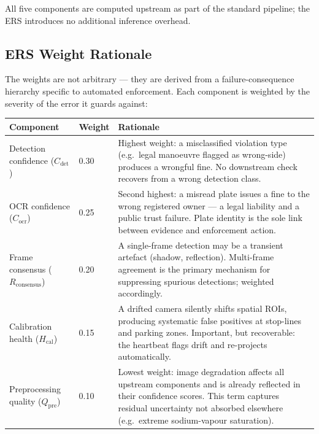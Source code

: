 \documentclass[11pt,a4paper]{article}
\begin{document}
\noindent All five components are computed upstream as part of the standard pipeline; the ERS introduces no additional inference overhead.

\subsection*{ERS Weight Rationale}

The weights are not arbitrary — they are derived from a failure-consequence hierarchy specific to automated enforcement. Each component is weighted by the severity of the error it guards against:

\begin{center}
\begin{longtable}{L{3.2cm} C{1.2cm} L{9.5cm}}
    \toprule
    \color{white}\textbf{Component} & \color{white}\textbf{Weight} & \color{white}\textbf{Rationale} \\
    \midrule
    Detection confidence ($C_{\text{det}}$) & 0.30 & Highest weight: a misclassified violation type (e.g.\ legal manoeuvre flagged as wrong-side) produces a wrongful fine. No downstream check recovers from a wrong detection class. \\
    OCR confidence ($C_{\text{ocr}}$) & 0.25 & Second highest: a misread plate issues a fine to the wrong registered owner — a legal liability and a public trust failure. Plate identity is the sole link between evidence and enforcement action. \\
    Frame consensus ($R_{\text{consensus}}$) & 0.20 & A single-frame detection may be a transient artefact (shadow, reflection). Multi-frame agreement is the primary mechanism for suppressing spurious detections; weighted accordingly. \\
    Calibration health ($H_{\text{cal}}$) & 0.15 & A drifted camera silently shifts spatial ROIs, producing systematic false positives at stop-lines and parking zones. Important, but recoverable: the heartbeat flags drift and re-projects automatically. \\
    Preprocessing quality ($Q_{\text{pre}}$) & 0.10 & Lowest weight: image degradation affects all upstream components and is already reflected in their confidence scores. This term captures residual uncertainty not absorbed elsewhere (e.g.\ extreme sodium-vapour saturation). \\
    \bottomrule
\end{longtable}
\end{center}
\end{document}

